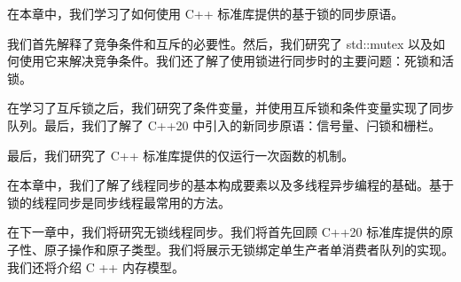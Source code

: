 在本章中，我们学习了如何使用 C++ 标准库提供的基于锁的同步原语。

我们首先解释了竞争条件和互斥的必要性。然后，我们研究了 std::mutex 以及如何使用它来解决竞争条件。我们还了解了使用锁进行同步时的主要问题：死锁和活锁。

在学习了互斥锁之后，我们研究了条件变量，并使用互斥锁和条件变量实现了同步队列。最后，我们了解了 C++20 中引入的新同步原语：信号量、闩锁和栅栏。

最后，我们研究了 C++ 标准库提供的仅运行一次函数的机制。

在本章中，我们了解了线程同步的基本构成要素以及多线程异步编程的基础。基于锁的线程同步是同步线程最常用的方法。

在下一章中，我们将研究无锁线程同步。我们将首先回顾 C++20 标准库提供的原子性、原子操作和原子类型。我们将展示无锁绑定单生产者单消费者队列的实现。我们还将介绍 C ++ 内存模型。